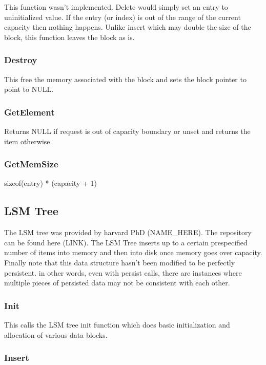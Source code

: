 \documentclass[twocolumn]{article}
\begin{document}
This function wasn't implemented. Delete would simply set an entry to
uninitialized value. If the entry (or index) is out of the range of the current
capacity then nothing happens. Unlike insert which may double the size of the
block, this function leaves the block as is.

\subsubsection{Destroy}

This free the memory associated with the block and sets the block pointer to
point to NULL.

\subsubsection{GetElement}

Returns NULL if request is out of capacity boundary or unset and returns the
item otherwise.

\subsubsection{GetMemSize}

sizeof(entry) * (capacity + 1)

\subsection{LSM Tree}

The LSM tree was provided by harvard PhD (NAME\_HERE). The repository can be
found here (LINK). The LSM Tree inserts up to a certain prespecified number of
items into memory and then into disk once memory goes over capacity. Finally
note that this data structure hasn't been modified to be perfectly persistent.
in other words, even with persist calls, there are instances where multiple
pieces of persisted data may not be consistent with each other.

\subsubsection{Init}

This calls the LSM tree init function which does basic initialization and
allocation of various data blocks.

\subsubsection{Insert}
\end{document}
